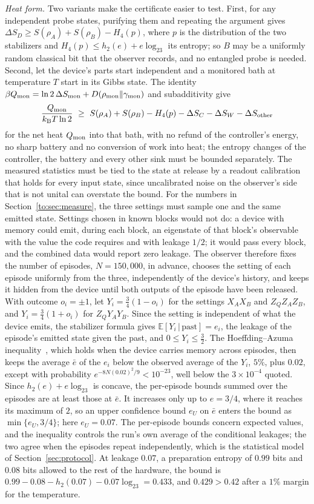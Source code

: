 \emph{Heat form.} Two variants make the certificate easier to test. First, for any independent probe states, purifying them and repeating the argument gives $\Delta S_D\ge S(\rho_A)+S(\rho_B)-H_4(p)$, where $p$ is the distribution of the two stabilizers and $H_4(p)\le h_2(e)+e\log_23$ its entropy; so $B$ may be a uniformly random classical bit that the observer records, and no entangled probe is needed. Second, let the device's parts start independent and a monitored bath at temperature $T$ start in its Gibbs state. The identity $\beta Q_{\rm mon}=\ln2\,\Delta S_{\rm mon}+D(\rho_{\rm mon}\|\gamma_{\rm mon})$ and subadditivity give
\[
\frac{Q_{\rm mon}}{\kB T\ln2}\ \ge\ S(\rho_A)+S(\rho_B)-H_4(p)-\Delta S_C-\Delta S_W-\Delta S_{\rm other}
\]
for the net heat $Q_{\rm mon}$ into that bath, with no refund of the controller's energy, no sharp battery and no conversion of work into heat; the entropy changes of the controller, the battery and every other sink must be bounded separately. The measured statistics must be tied to the state at release by a readout calibration that holds for every input state, since uncalibrated noise on the observer's side that is not unital can overstate the bound. For the numbers in Section~\ref{to:sec:measure}, the three settings must sample one and the same emitted state. Settings chosen in known blocks would not do: a device with memory could emit, during each block, an eigenstate of that block's observable with the value the code requires and with leakage $1/2$; it would pass every block, and the combined data would report zero leakage. The observer therefore fixes the number of episodes, $N=150{,}000$, in advance, chooses the setting of each episode uniformly from the three, independently of the device's history, and keeps it hidden from the device until both outputs of the episode have been released. With outcome $o_i=\pm1$, let $Y_i=\tfrac34(1-o_i)$ for the settings $X_AX_B$ and $Z_QZ_AZ_B$, and $Y_i=\tfrac34(1+o_i)$ for $Z_QY_AY_B$. Since the setting is independent of what the device emits, the stabilizer formula gives $\mathbb E[Y_i\,|\,\text{past}]=e_i$, the leakage of the episode's emitted state given the past, and $0\le Y_i\le\tfrac32$. The Hoeffding--Azuma inequality~\cite{Hoeffding63,Azuma67}, which holds when the device carries memory across episodes, then keeps the average $\bar e$ of the $e_i$ below the observed average of the $Y_i$, $5\%$, plus $0.02$, except with probability $e^{-8N(0.02)^2/9}<10^{-23}$, well below the $3\times10^{-4}$ quoted. Since $h_2(e)+e\log_23$ is concave, the per-episode bounds summed over the episodes are at least those at $\bar e$. It increases only up to $e=3/4$, where it reaches its maximum of $2$, so an upper confidence bound $e_U$ on $\bar e$ enters the bound as $\min\{e_U,3/4\}$; here $e_U=0.07$. The per-episode bounds concern expected values, and the inequality controls the run's own average of the conditional leakages; the two agree when the episodes repeat independently, which is the statistical model of Section~\ref{sec:protocol}. At leakage $0.07$, a preparation entropy of $0.99$ bits and $0.08$ bits allowed to the rest of the hardware, the bound is $0.99-0.08-h_2(0.07)-0.07\log_23=0.433$, and $0.429>0.42$ after a $1\%$ margin for the temperature.

